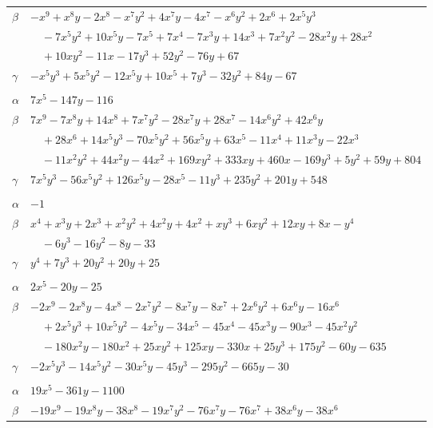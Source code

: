 \documentclass[11pt]{article}
\begin{document}
\begin{longtable}{@{}ll@{}}
$\beta$ & $-x^{9}+x^{8}y-2x^{8}-x^{7}y^{2}+4x^{7}y-4x^{7}-x^{6}y^{2}+2x^{6}+2x^{5}y^{3}$\\
 & $\quad -7x^{5}y^{2}+10x^{5}y-7x^{5}+7x^{4}-7x^{3}y+14x^{3}+7x^{2}y^{2}-28x^{2}y+28x^{2}$\\
 & $\quad +10xy^{2}-11x-17y^{3}+52y^{2}-76y+67$\\
$\gamma$ & $-x^{5}y^{3}+5x^{5}y^{2}-12x^{5}y+10x^{5}+7y^{3}-32y^{2}+84y-67$\\
\addlinespace[3pt]
\multicolumn{2}{@{}l}{$\{i,j\}=\{14,42\}$, $k_{ij}=2^{3}\cdot 3\cdot 5\cdot 17$}\\
$\alpha$ & $7x^{5}-147y-116$\\
$\beta$ & $7x^{9}-7x^{8}y+14x^{8}+7x^{7}y^{2}-28x^{7}y+28x^{7}-14x^{6}y^{2}+42x^{6}y$\\
 & $\quad +28x^{6}+14x^{5}y^{3}-70x^{5}y^{2}+56x^{5}y+63x^{5}-11x^{4}+11x^{3}y-22x^{3}$\\
 & $\quad -11x^{2}y^{2}+44x^{2}y-44x^{2}+169xy^{2}+333xy+460x-169y^{3}+5y^{2}+59y+804$\\
$\gamma$ & $7x^{5}y^{3}-56x^{5}y^{2}+126x^{5}y-28x^{5}-11y^{3}+235y^{2}+201y+548$\\
\addlinespace[3pt]
\multicolumn{2}{@{}l}{$\{i,j\}=\{15,17\}$, $k_{ij}=2^{3}\cdot 5$}\\
$\alpha$ & $-1$\\
$\beta$ & $x^{4}+x^{3}y+2x^{3}+x^{2}y^{2}+4x^{2}y+4x^{2}+xy^{3}+6xy^{2}+12xy+8x-y^{4}$\\
 & $\quad -6y^{3}-16y^{2}-8y-33$\\
$\gamma$ & $y^{4}+7y^{3}+20y^{2}+20y+25$\\
\addlinespace[3pt]
\multicolumn{2}{@{}l}{$\{i,j\}=\{15,26\}$, $k_{ij}=3^{5}\cdot 5$}\\
$\alpha$ & $2x^{5}-20y-25$\\
$\beta$ & $-2x^{9}-2x^{8}y-4x^{8}-2x^{7}y^{2}-8x^{7}y-8x^{7}+2x^{6}y^{2}+6x^{6}y-16x^{6}$\\
 & $\quad +2x^{5}y^{3}+10x^{5}y^{2}-4x^{5}y-34x^{5}-45x^{4}-45x^{3}y-90x^{3}-45x^{2}y^{2}$\\
 & $\quad -180x^{2}y-180x^{2}+25xy^{2}+125xy-330x+25y^{3}+175y^{2}-60y-635$\\
$\gamma$ & $-2x^{5}y^{3}-14x^{5}y^{2}-30x^{5}y-45y^{3}-295y^{2}-665y-30$\\
\addlinespace[3pt]
\multicolumn{2}{@{}l}{$\{i,j\}=\{15,30\}$, $k_{ij}=2^{5}\cdot 3^{2}\cdot 5$}\\
$\alpha$ & $19x^{5}-361y-1100$\\
$\beta$ & $-19x^{9}-19x^{8}y-38x^{8}-19x^{7}y^{2}-76x^{7}y-76x^{7}+38x^{6}y-38x^{6}$\\

\end{longtable}
\end{document}

